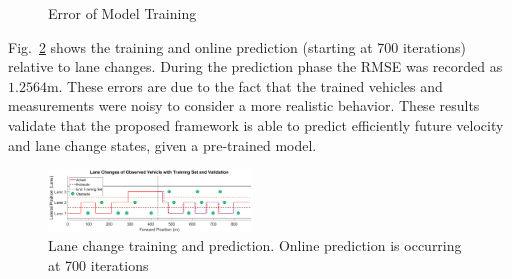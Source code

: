 \documentclass[letterpaper, 10 pt, conference]{ieeeconf}  %
\begin{document}
\begin{figure}[ht!]
	\centering
	\vspace{-5pt}
	\caption{Error of Model Training}
	\label{fig:trainerrors}
	\vspace{-5pt}
\end{figure}


Fig.~\ref{fig:train2} shows the training and online prediction (starting at 700 iterations) relative to lane changes. During the prediction phase the RMSE was recorded as $1.2564$m. These errors are due to the fact that the trained vehicles and measurements were noisy to consider a more realistic behavior. These results validate that the proposed framework is able to predict efficiently future velocity and lane change states, given a pre-trained model.

\begin{figure}[ht]
\includegraphics[width=0.48\textwidth]{fig/train2.png}
 \vspace{-5pt}
\caption{Lane change training and prediction. Online prediction is occurring at 700 iterations} \label{fig:train2}
\end{figure}
\end{document}
